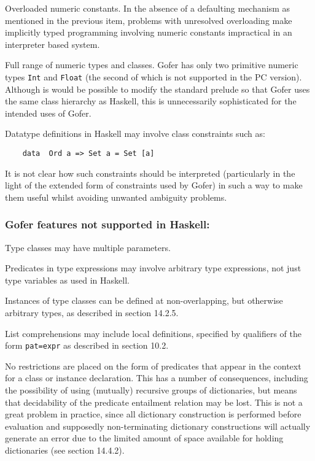 \IT  Overloaded numeric constants.  In  the  absence  of  a  defaulting
     mechanism  as  mentioned  in  the  previous  item,  problems  with
     unresolved overloading make implicitly typed programming involving
     numeric constants impractical in an interpreter based system.

\IT  Full range of numeric types  and  classes.   Gofer  has  only  two
     primitive numeric types \verb"Int" and \verb"Float" 
     (the second of which is  not
     supported in the PC version).  Although is would  be  possible  to
     modify the standard prelude so that  Gofer  uses  the  same  class
     hierarchy as Haskell, this is unnecessarily sophisticated for  the
     intended uses of Gofer.

\IT  Datatype definitions in Haskell may involve class constraints such
     as:
\begin{verbatim}
    data  Ord a => Set a = Set [a]
\end{verbatim}
     It is  not  clear  how  such  constraints  should  be  interpreted
     (particularly in the light of the  extended  form  of  constraints
     used by Gofer) in such a way to  make them useful whilst  avoiding
     unwanted ambiguity problems.
\EI

\subsubsection*{Gofer features not supported in Haskell:}
\BI
\IT  Type classes may have multiple parameters.

\IT  Predicates  in  type  expressions  may  involve   arbitrary   type
     expressions, not just type variables as used in Haskell.

\IT  Instances of type classes can be defined at  non-overlapping,  but
     otherwise arbitrary types, as described in section 14.2.5.

\IT  List comprehensions  may include  local definitions,  specified by
     qualifiers of the form \verb"pat=expr" as described in section 10.2.

\IT  No restrictions are placed on the form of predicates  that  appear
     in the context for a class or instance declaration.   This  has  a
     number  of  consequences,  including  the  possibility  of   using
     (mutually)  recursive  groups  of  dictionaries,  but  means  that
     decidability of the predicate entailment  relation  may  be  lost.
     This is not a great problem  in  practice,  since  all  dictionary
     construction  is  performed  before  evaluation   and   supposedly
     non-terminating dictionary constructions will actually generate an
     error due to the limited amount of  space  available  for  holding
     dictionaries (see section 14.4.2).
\EI

